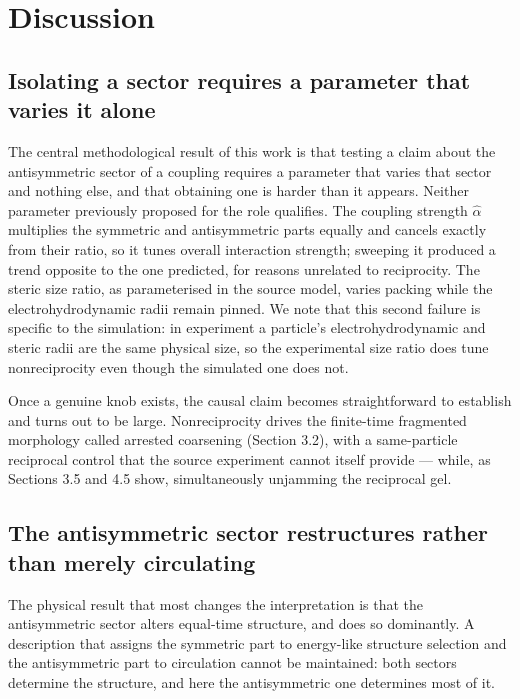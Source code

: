 \documentclass[aps,pre,preprint,superscriptaddress,nofootinbib,longbibliography]{revtex4-2}
\begin{document}
\section{Discussion}

\subsection{Isolating a sector requires a parameter that varies it alone}

The central methodological result of this work is that testing a claim about the antisymmetric sector of a coupling requires a parameter that varies that sector and nothing else, and that obtaining one is harder than it appears. Neither parameter previously proposed for the role qualifies. The coupling strength $\hat{\alpha}$ multiplies the symmetric and antisymmetric parts equally and cancels exactly from their ratio, so it tunes overall interaction strength; sweeping it produced a trend opposite to the one predicted, for reasons unrelated to reciprocity. The steric size ratio, as parameterised in the source model, varies packing while the electrohydrodynamic radii remain pinned. We note that this second failure is specific to the simulation: in experiment a particle's electrohydrodynamic and steric radii are the same physical size, so the experimental size ratio does tune nonreciprocity even though the simulated one does not.

Once a genuine knob exists, the causal claim becomes straightforward to establish and turns out to be large. Nonreciprocity drives the finite-time fragmented morphology called arrested coarsening (Section 3.2), with a same-particle reciprocal control that the source experiment cannot itself provide --- while, as Sections 3.5 and 4.5 show, simultaneously unjamming the reciprocal gel.

\subsection{The antisymmetric sector restructures rather than merely circulating}

The physical result that most changes the interpretation is that the antisymmetric sector alters equal-time structure, and does so dominantly. A description that assigns the symmetric part to energy-like structure selection and the antisymmetric part to circulation cannot be maintained: both sectors determine the structure, and here the antisymmetric one determines most of it.
\end{document}
